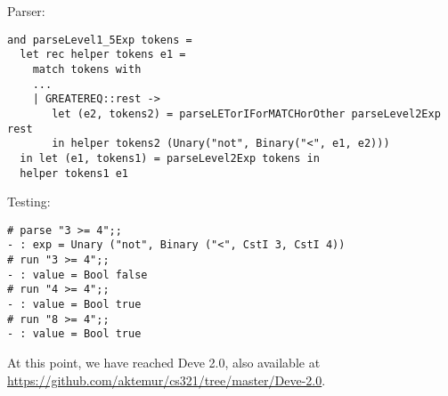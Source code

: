 \documentclass[addpoints]{exam}
\begin{document}
\begin{questions}
\begin{solution}
    Parser:
    \begin{verbatim}
and parseLevel1_5Exp tokens =
  let rec helper tokens e1 =
    match tokens with
    ...
    | GREATEREQ::rest ->
       let (e2, tokens2) = parseLETorIForMATCHorOther parseLevel2Exp rest
       in helper tokens2 (Unary("not", Binary("<", e1, e2)))
  in let (e1, tokens1) = parseLevel2Exp tokens in
  helper tokens1 e1
    \end{verbatim}    

    Testing:
    \begin{verbatim}
# parse "3 >= 4";;
- : exp = Unary ("not", Binary ("<", CstI 3, CstI 4))
# run "3 >= 4";;  
- : value = Bool false
# run "4 >= 4";;
- : value = Bool true
# run "8 >= 4";;
- : value = Bool true
    \end{verbatim}
  \end{solution}

  \begin{framed}
    {\color{red}
    At this point, we have reached Deve 2.0, also available at
    \url{https://github.com/aktemur/cs321/tree/master/Deve-2.0}.
    }
  \end{framed}

  
\end{questions}
\end{document}
